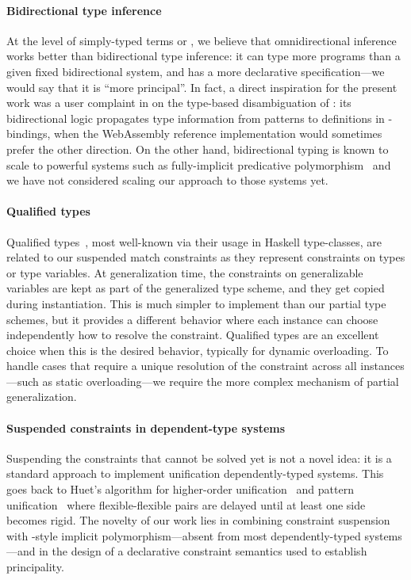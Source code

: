 \documentclass[acmsmall,screen,nonacm,review]{acmart}
\begin{document}
\paragraph{Bidirectional type inference}

At the level of simply-typed
terms or \ML, we believe that omnidirectional inference works better
than bidirectional type inference: it can type more programs than
a given fixed bidirectional system, and has a more declarative
specification---we would say that it is ``more principal''.  In fact,
a direct inspiration for the present work was a user complaint in
\citet*{rossberg-wasm} on the type-based disambiguation of \OCaml: its
bidirectional logic propagates type information from patterns to
definitions in -bindings, when the WebAssembly reference
implementation would sometimes prefer the other direction.
%
%
On the other hand, bidirectional typing is known to scale to powerful
systems such as fully-implicit predicative
polymorphism~\citep*{dunfield-krishnaswami-bidirectional-poly} and we
have not considered scaling our approach to those systems yet.


\paragraph{Qualified types}

Qualified types~\citep*{jones-qualified-types}, most well-known via their usage
in Haskell type-classes, are related to our suspended match constraints as they
represent constraints on types or type variables. At generalization time, the
constraints on generalizable variables are kept as part of the generalized type
scheme, and they get copied during instantiation. This is much simpler to
implement than our partial type schemes, but it provides a different behavior
where each instance can choose independently how to resolve the constraint.
Qualified types are an excellent choice when this is the desired behavior,
typically for dynamic overloading. To handle cases that require a unique
resolution of the constraint across all instances---such as static
overloading---we require the more complex mechanism of partial generalization.

\paragraph{Suspended constraints in dependent-type systems}

Suspending the constraints that cannot be solved yet is not a novel idea: it
is a standard approach to implement unification dependently-typed
systems. This goes back to Huet's algorithm for higher-order
unification~\citep*{huet-unif} and pattern
unification~\citep*{Miller/pattern-unif@iclp91} where flexible-flexible
pairs are delayed until at least one side becomes rigid. The novelty of our
work lies in combining constraint suspension with \ML-style implicit
polymorphism---absent from most dependently-typed systems---and in the design
of a declarative constraint semantics used to establish principality.
\end{document}
